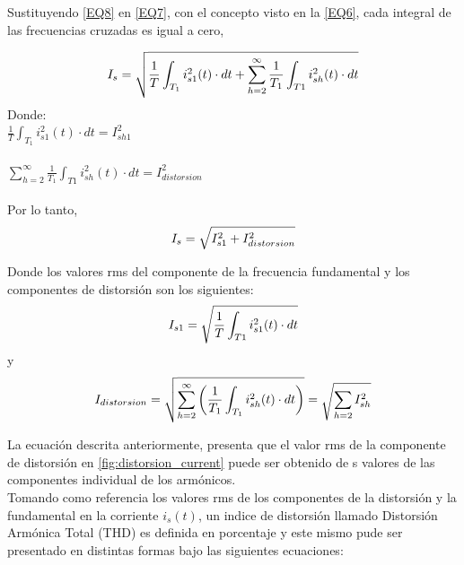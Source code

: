 Sustituyendo \ref{EQ8} en \ref{EQ7}, con el concepto visto en la \ref{EQ6}, cada integral de las frecuencias cruzadas es igual a cero,

\begin{equation}\label{EQ9}
I_{s} = \sqrt{\frac{1}{T}\int_{T_{1}}^{}i^2_{s1}(t) \cdot dt + \sum_{h=2}^{\infty}\frac{1}{T_{1}}\int_{T1}^{}i^2_{sh}(t)\cdot dt}\\
\end{equation}
Donde:\\
$\frac{1}{T}\int_{T_{1}}^{}i^2_{s1}(t) \cdot dt = I^2_{sh1}$\\\\
$\sum_{h=2}^{\infty}\frac{1}{T_{1}}\int_{T1}^{}i^2_{sh}(t)\cdot dt = I^2_{distorsion}$\\\\
Por lo tanto,\\
\begin{equation}\label{EQ10}
I_{s} = \sqrt{I^2_{s1}+I^2_{distorsion}}\\\\
\end{equation}

Donde los valores rms del componente de la frecuencia fundamental y los componentes de distorsión son los siguientes:\\
\begin{equation}\label{EQ11}
I_{s1}=\sqrt{\frac{1}{T}\int_{T1}^{}i^2_{s1}(t) \cdot dt}\\
\end{equation}
y\\
\begin{equation}\label{EQ12}
I_{distorsion}=\sqrt{\sum_{h=2}^{\infty}\left(\frac{1}{T_{1}}\int_{T_{1}}^{}i^2_{sh}(t)\cdot dt\right)}=\sqrt{\sum_{h=2}^{}I^2_{sh}}\\\\
\end{equation}

La ecuación descrita anteriormente, presenta que el valor rms de la componente de distorsión en \ref{fig:distorsion_current} puede ser obtenido de s valores de las componentes individual de los armónicos.\cite{A29}\\

Tomando como referencia los valores rms de los componentes de la distorsión y la fundamental en la corriente $i_{s}(t)$, un indice de distorsión llamado Distorsión Armónica Total (THD) es definida en porcentaje y este mismo pude ser presentado en distintas formas bajo las siguientes ecuaciones:\\

